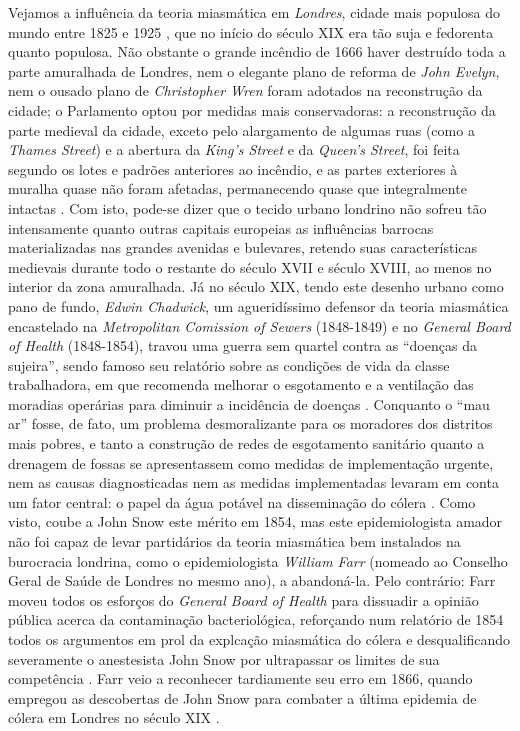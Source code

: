 Vejamos a influência da teoria miasmática em \textit{Londres}, cidade mais populosa do mundo entre 1825 e 1925 \cite{morris_socdev_2010}, que no início do século XIX era tão suja e fedorenta quanto populosa. Não obstante o grande incêndio de 1666 haver destruído toda a parte amuralhada de Londres, nem o elegante plano de reforma de \textit{John Evelyn}, nem o ousado plano de \textit{Christopher Wren} foram adotados na reconstrução da cidade; o Parlamento optou por medidas mais conservadoras: a reconstrução da parte medieval da cidade, exceto pelo alargamento de algumas ruas (como a \textit{Thames Street}) e a abertura da \textit{King's Street} e da \textit{Queen's Street}, foi feita segundo os lotes e padrões anteriores ao incêndio, e as partes exteriores à muralha quase não foram afetadas, permanecendo quase que integralmente intactas \cite{peets_reblondon_1930,hanson_londonfire_1989}. Com isto, pode-se dizer que o tecido urbano londrino não sofreu tão intensamente quanto outras capitais europeias as influências barrocas materializadas nas grandes avenidas e bulevares, retendo suas características medievais durante todo o restante do século XVII e século XVIII, ao menos no interior da zona amuralhada. Já no século XIX, tendo este desenho urbano como pano de fundo, \textit{Edwin Chadwick}, um agueridíssimo defensor da teoria miasmática encastelado na \textit{Metropolitan Comission of Sewers} (1848-1849) e no \textit{General Board of Health} (1848-1854), travou uma guerra sem quartel contra as ``doenças da sujeira'', sendo famoso seu relatório sobre as condições de vida da classe trabalhadora, em que recomenda melhorar o esgotamento e a ventilação das moradias operárias para diminuir a incidência de doenças \cite{chadwick_report_1842}. Conquanto o ``mau ar'' fosse, de fato, um problema desmoralizante para os moradores dos distritos mais pobres, e tanto a construção de redes de esgotamento sanitário quanto a drenagem de fossas se apresentassem como medidas de implementação urgente, nem as causas diagnosticadas nem as medidas implementadas levaram em conta um fator central: o papel da água potável na disseminação do cólera \cite[p.~84]{platt_landuse_2014}. Como visto, coube a John Snow este mérito em 1854, mas este epidemiologista amador não foi capaz de levar partidários da teoria miasmática bem instalados na burocracia londrina, como o epidemiologista \textit{William Farr} (nomeado ao Conselho Geral de Saúde de Londres no mesmo ano), a abandoná-la. Pelo contrário: Farr moveu todos os esforços do \textit{General Board of Health} para dissuadir a opinião pública acerca da contaminação bacteriológica, reforçando num relatório de 1854 todos os argumentos em prol da explcação miasmática do cólera e desqualificando severamente o anestesista John Snow por ultrapassar os limites de sua competência \cite{farr_report_1854}. Farr veio a reconhecer tardiamente seu erro em 1866, quando empregou as descobertas de John Snow para combater a última epidemia de cólera em Londres no século XIX \cite[p.~1.471]{halliday_miaslond_2001}. 

